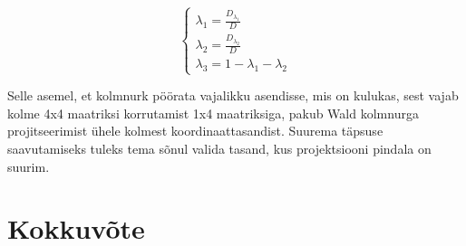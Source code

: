 \documentclass[a4paper,12pt]{report}
\begin{document}
\begin{equation} \label{eq:bary-3}  
  \left\{
  \begin{array}{l}
    \lambda_1 = \frac{D_{\lambda_1}}{D} \\
    \lambda_2 = \frac{D_{\lambda_2}}{D} \\
    \lambda_3 = 1-\lambda_1-\lambda_2
  \end{array}
  \right.
\end{equation}

Selle asemel, et kolmnurk pöörata vajalikku asendisse, mis on kulukas, sest
vajab kolme 4x4 maatriksi korrutamist 1x4 maatriksiga, pakub Wald kolmnurga
projitseerimist ühele kolmest koordinaattasandist. Suurema täpsuse saavutamiseks
tuleks tema sõnul valida tasand, kus projektsiooni pindala on suurim. \cite[lk.~91]{wald::PhD}

\chapter*{Kokkuvõte}

\renewcommand\bibname{Kasutatud materjalid}


\end{document}
